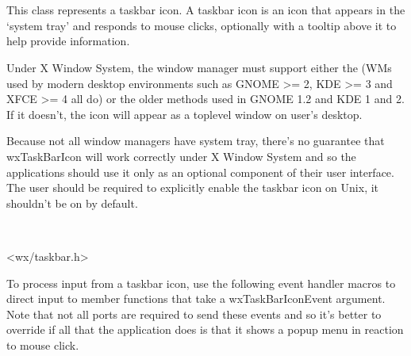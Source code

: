 \section{}\label{wxtaskbaricon}

This class represents a taskbar icon. A taskbar icon is an icon that appears in the `system tray' and responds to mouse clicks, optionally with a tooltip above it to help provide information.


Under X Window System, the window manager must support either
the 
(WMs used by modern desktop environments such as GNOME >= 2, KDE
>= 3 and XFCE >= 4 all do) or the older methods used in GNOME 1.2 and
KDE 1 and 2. If it doesn't, the icon will appear as a toplevel window on
user's desktop.

Because not all window managers have system tray, there's no guarantee that
wxTaskBarIcon will work correctly under X Window System and so the applications
should use it only as an optional component of their user interface. The user
should be required to explicitly enable the taskbar icon on Unix, it shouldn't
be on by default.



\\


<wx/taskbar.h>




To process input from a taskbar icon, use the following event handler macros to direct input to member
functions that take a wxTaskBarIconEvent argument. Note that not all ports are
required to send these events and so it's better to override
 if all that
the application does is that it shows a popup menu in reaction to mouse click.


